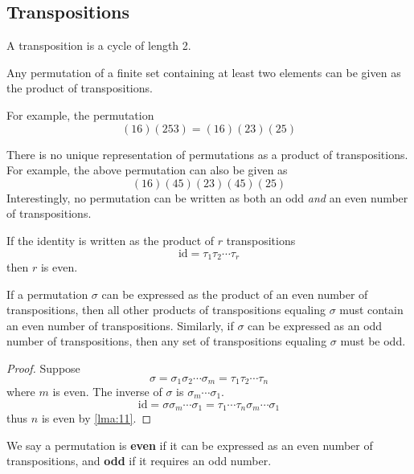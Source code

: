 \documentclass[12pt, letterpaper]{report}
\begin{document}
\subsection*{Transpositions}
\begin{definition}[Transposition]
	A transposition is a cycle of length 2.
\end{definition}
\begin{proposition}
	Any permutation of a finite set containing at least two elements can be given as the product of transpositions.
\end{proposition}
\begin{eg}
	For example, the permutation
	\[
		(16)(253)=(16)(23)(25)
	\]
\end{eg}
There is no unique representation of permutations as a product of transpositions. For example, the above permutation can also be given as
\[
	(16)(45)(23)(45)(25)
\]
Interestingly, no permutation can be written as both an odd \emph{and} an even number of transpositions. 
\begin{lemma}\label{lma:11}
	If the identity is written as the product of \(r\) transpositions 
	\[
		\text{id}=\tau _1 \tau _2 \cdots \tau _r 
	\]
	then \(r\) is even.
\end{lemma}
\begin{theorem}
	If a permutation \(\sigma \) can be expressed as the product of an even number of transpositions, then all other products of transpositions equaling \(\sigma \) must contain an even number of transpositions. Similarly, if \(\sigma \) can be expressed as an odd number of transpositions, then any set of transpositions equaling \(\sigma \) must be odd.
\end{theorem}
\begin{proof}
	Suppose 
	\[
		\sigma =\sigma _1 \sigma _2\cdots \sigma _m =\tau _1 \tau _2 \cdots \tau _n
	\]
	where \(m\) is even. The inverse of \(\sigma \) is \(\sigma _m \cdots \sigma _1\).
	\[
		\text{id} =\sigma \sigma _m \cdots \sigma _1=\tau _1\cdots \tau _n \sigma _m\cdots \sigma _1
	\]
thus \(n\) is even by \ref{lma:11}.
\end{proof}
We say a permutation is \textbf{even} if it can be expressed as an even number of transpositions, and \textbf{odd} if it requires an odd number.
\end{document}
